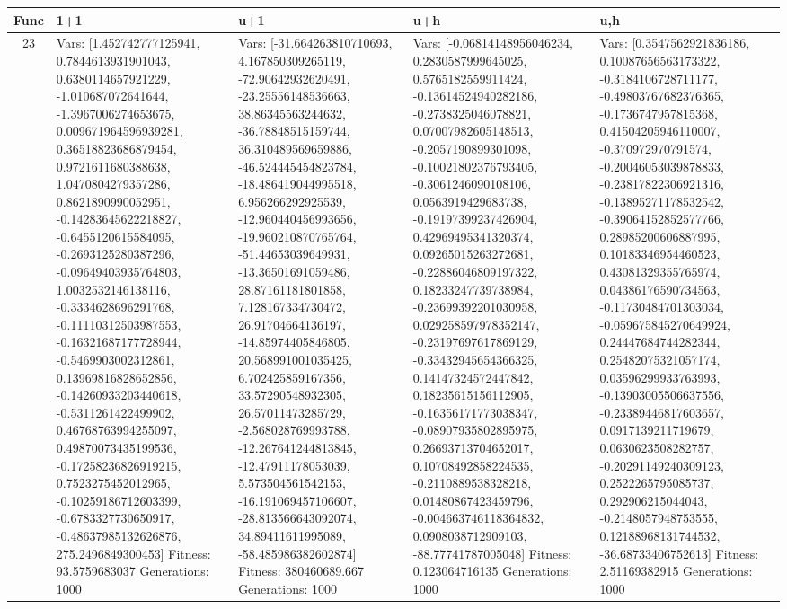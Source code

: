 \documentclass[landscape,11pt]{article}
\begin{document}
\newpage
\begin{tabular}{|c|p{5.4cm}|p{5.4cm}|p{5.4cm}|p{5.4cm}|}
\hline
Func & 1+1 & u+1 & u+h & u,h \\ 
\hline 23 & Vars: [1.452742777125941, 0.7844613931901043, 0.6380114657921229, -1.010687072641644, -1.3967006274653675, 0.009671964596939281, 0.36518823686879454, 0.9721611680388638, 1.0470804279357286, 0.8621890990052951, -0.14283645622218827, -0.6455120615584095, -0.2693125280387296, -0.09649403935764803, 1.0032532146138116, -0.3334628696291768, -0.11110312503987553, -0.16321687177728944, -0.5469903002312861, 0.13969816828652856, -0.14260933203440618, -0.5311261422499902, 0.46768763994255097, 0.49870073435199536, -0.17258236826919215, 0.7523275452012965, -0.10259186712603399, -0.6783327730650917, -0.48637985132626876, 275.2496849300453] Fitness: 93.5759683037 Generations: 1000 & Vars: [-31.664263810710693, 4.167850309265119, -72.90642932620491, -23.25556148536663, 38.86345563244632, -36.78848515159744, 36.310489569659886, -46.524445454823784, -18.486419044995518, 6.956266292925539, -12.960440456993656, -19.960210870765764, -51.44653039649931, -13.36501691059486, 28.87161181801858, 7.128167334730472, 26.91704664136197, -14.85974405846805, 20.568991001035425, 6.702425859167356, 33.57290548932305, 26.57011473285729, -2.568028769993788, -12.267641244813845, -12.47911178053039, 5.573504561542153, -16.191069457106607, -28.813566643092074, 34.89411611995089, -58.485986382602874] Fitness: 380460689.667 Generations: 1000 & Vars: [-0.06814148956046234, 0.2830587999645025, 0.5765182559911424, -0.13614524940282186, -0.2738325046078821, 0.07007982605148513, -0.2057190899301098, -0.10021802376793405, -0.3061246090108106, 0.0563919429683738, -0.19197399237426904, 0.42969495341320374, 0.09265015263272681, -0.22886046809197322, 0.18233247739738984, -0.23699392201030958, 0.029258597978352147, -0.23197697617869129, -0.33432945654366325, 0.14147324572447842, 0.18235615156112905, -0.16356171773038347, -0.08907935802895975, 0.26693713704652017, 0.10708492858224535, -0.2110889538328218, 0.01480867423459796, -0.004663746118364832, 0.0908038712909103, -88.77741787005048] Fitness: 0.123064716135 Generations: 1000 & Vars: [0.3547562921836186, 0.10087656563173322, -0.3184106728711177, -0.49803767682376365, -0.1736747957815368, 0.41504205946110007, -0.370972970791574, -0.20046053039878833, -0.23817822306921316, -0.13895271178532542, -0.39064152852577766, 0.28985200606887995, 0.10183346954460523, 0.43081329355765974, 0.04386176590734563, -0.11730484701303034, -0.059675845270649924, 0.24447684744282344, 0.25482075321057174, 0.03596299933763993, -0.13903005506637556, -0.23389446817603657, 0.0917139211719679, 0.0630623508282757, -0.20291149240309123, 0.2522265795085737, 0.292906215044043, -0.2148057948753555, 0.12188968131744532, -36.68733406752613] Fitness: 2.51169382915 Generations: 1000 \\
 \hline 
\end{tabular}
\end{document}
